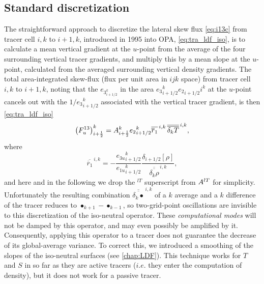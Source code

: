 \documentclass[../tex_main/NEMO_manual]{subfiles}
\begin{document}
\subsection{Standard discretization}
The straightforward approach to discretize the lateral skew flux
\autoref{eq:i13c} from tracer cell $i,k$ to $i+1,k$, introduced in 1995 into OPA,
\autoref{eq:tra_ldf_iso}, is to calculate a mean vertical gradient at the $u$-point from
the average of the four surrounding vertical tracer gradients, and multiply this by a mean slope at the $u$-point,
calculated from the averaged surrounding vertical density gradients.
The total area-integrated skew-flux (flux per unit area in $ijk$ space) from tracer cell $i,k$ to $i+1,k$,
noting that the $e_{{3}_{i+1/2}^k}$ in the area $e{_{3}}_{i+1/2}^k{e_{2}}_{i+1/2}i^k$ at the $u$-point cancels out with
the $1/{e_{3}}_{i+1/2}^k$ associated with the vertical tracer gradient, is then \autoref{eq:tra_ldf_iso}
\begin{equation*}
  \left(F_u^{13} \right)_{i+\scriptstyle\frac{1}{2}}^k = {A}_{i+\scriptstyle\frac{1}{2}}^k
  {e_{2}}_{i+1/2}^k \overline{\overline
    r_1} ^{\,i,k}\,\overline{\overline{\delta_k T}}^{\,i,k},
\end{equation*}
where
\begin{equation*}
  \overline{\overline
   r_1} ^{\,i,k} = -\frac{{e_{3u}}_{i+1/2}^k}{{e_{1u}}_{i+1/2}^k}
  \frac{\delta_{i+1/2} [\rho]}{\overline{\overline{\delta_k \rho}}^{\,i,k}},
\end{equation*}
and here and in the following we drop the $^{lT}$ superscript from ${A^{lT}}$ for simplicity.
Unfortunately the resulting combination $\overline{\overline{\delta_k\bullet}}^{\,i,k}$ of a $k$ average and
a $k$ difference of the tracer reduces to $\bullet_{k+1}-\bullet_{k-1}$,
so two-grid-point oscillations are invisible to this discretization of the iso-neutral operator.
These \emph{computational modes} will not be damped by this operator, and may even possibly be amplified by it.
Consequently, applying this operator to a tracer does not guarantee the decrease of its global-average variance.
To correct this, we introduced a smoothing of the slopes of the iso-neutral surfaces (see \autoref{chap:LDF}).
This technique works for $T$ and $S$ in so far as they are active tracers
($i.e.$ they enter the computation of density), but it does not work for a passive tracer.
\end{document}
